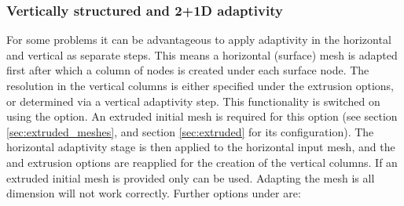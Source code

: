 \subsubsection{Vertically structured and 2+1D adaptivity}
\label{sec:vertically_structured_adaptivity}
For some problems it can be advantageous to apply adaptivity in the horizontal
and vertical as separate steps. This means a horizontal (surface) mesh is
adapted first after which a column of nodes is created under each surface node.
The resolution in the vertical columns is either specified under the extrusion
options, or determined via a vertical adaptivity step. This functionality is switched
on using the  option. An extruded
initial mesh is required for this option (see section \ref{sec:extruded_meshes},
and section \ref{sec:extruded} for its configuration). The horizontal adaptivity
stage is then applied to the horizontal input mesh, and the
 and  extrusion options are
 reapplied for the creation of the vertical columns.
If an extruded initial mesh is
provided only  can be used. Adapting the
mesh is all dimension will not work correctly.
Further options under
 are:
